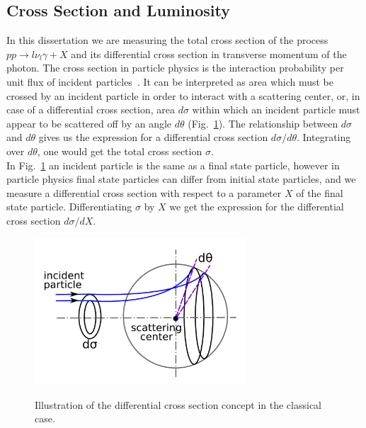 \subsection{Cross Section and Luminosity}
\label{sec:LumiAndCS}

In this dissertation we are measuring the total cross section of the process $pp \rightarrow l \nu_l \gamma + X$ and its differential cross section in transverse momentum of the photon. The cross section in particle physics is the interaction probability per unit flux of incident particles~\cite{ref_fnal_LumiCS}. It can be interpreted as area which must be crossed by an incident particle in order to interact with a scattering center, or, in case of a differential cross section, area $d\sigma$ within which an incident particle must appear to be scattered off by an angle $d\theta$ (Fig.~\ref{fig:CSclassical}). The relationship between $d\sigma$ and $d\theta$ gives us the expression for a differential cross section $d\sigma/d\theta$. Integrating over $d\theta$, one would get the total cross section $\sigma$. \\

In Fig.~\ref{fig:CSclassical} an incident particle is the same as a final state particle, however in particle physics final state particles can differ from initial state particles, and we measure a differential cross section with respect to a parameter $X$ of the final state particle. Differentiating $\sigma$ by $X$ we get the expression for the differential cross section $d\sigma/dX$.\\

\begin{figure}[htb]
  \begin{center}
    {\includegraphics[width=0.70\textwidth]{../figs/WgAbout/CSclassical.png}}
    \caption{Illustration of the differential cross section concept in the classical case.}
    \label{fig:CSclassical}
  \end{center}
\end{figure}

